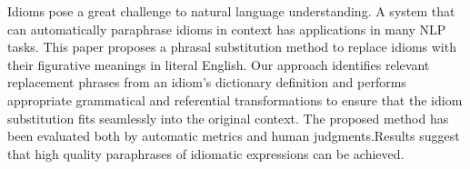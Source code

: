 Idioms pose a great challenge to natural language understanding. A system that can automatically paraphrase idioms in context has applications in many NLP tasks. This paper proposes a phrasal substitution method to replace idioms with their figurative meanings in literal English. Our approach identifies relevant replacement phrases from an idiom's dictionary definition and performs appropriate grammatical and referential transformations to ensure that the idiom substitution fits seamlessly into the original context. The proposed method has been evaluated both by automatic metrics and human judgments.Results suggest that high quality paraphrases of idiomatic expressions can be achieved.
